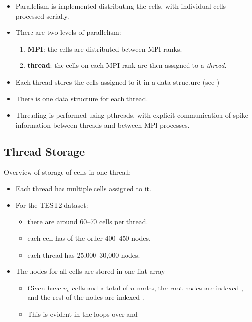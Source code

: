 \begin{itemize}
\item
    Parallelism is implemented distributing the cells, with individual cells processed serially.
\item
    There are two levels of parallelism:
    \begin{enumerate}
    \item
        \textbf{MPI}: the cells are distributed between MPI ranks.
    \item
        \textbf{thread}: the cells on each MPI rank are then assigned to a \emph{thread}.
    \end{enumerate}
\item
    Each thread stores the cells assigned to it in a  data structure (see )
\item
    There is one  data structure for each thread.
\item
    Threading is performed using pthreads, with explicit communication of spike information between threads and between MPI processes.
\end{itemize}

\subsection{Thread Storage}
Overview of storage of cells in one thread:
\begin{itemize}
\item
    Each thread has multiple cells assigned to it.
\item
    For the TEST2 dataset:
    \begin{itemize}
    \item
        there are around 60--70 cells per thread.
    \item
        each cell has of the order 400--450 nodes.
    \item
        each thread has 25,000--30,000 nodes.
    \end{itemize}
\item
    The nodes for all cells are stored in one flat array
    \begin{itemize}
    \item
        Given have $n_c$ cells and a total of $n$ nodes, the root nodes are indexed \lst{[1:n_c]}, and the rest of the nodes are indexed \lst{[n_c+1:n]}.
    \item
        This is evident in the loops over  and 
    \end{itemize}
\end{itemize}

